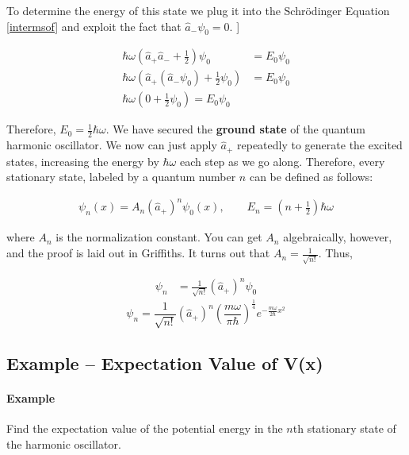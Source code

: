 To determine the energy of this state we plug it into the Schr\"odinger
Equation \ref{intermsof} and exploit the fact that $\hat{a}_-\psi_0 = 0$. ]


\begin{align} \label{}
  \hbar\omega\left(\hat{a}_+\hat{a}_- + \frac{1}{2}\right)\psi_0 &= E_0\psi_0\\
  \hbar\omega\left(\hat{a}_+(\hat{a}_-\psi_0) + \frac{1}{2}\psi_0\right) &=
  E_0\psi_0 \\ \hbar\omega \left( 0  + \frac{1}{2}\psi_0\right)  = E_0\psi_0
\end{align}\vspace{3px}

Therefore, $E_0 = \frac{1}{2}\hbar\omega$. We have secured the \textbf{ground
state} of the quantum harmonic oscillator. We now can just apply $\hat{a}_+$
repeatedly to generate the excited states, increasing the energy by
$\hbar\omega$ each step as we go along. Therefore, every stationary state,
labeled by a quantum number $n$ can be defined as follows:

\begin{align} \label{harmenergy}
   \psi_n(x) = A_n(\hat{a}_+)^n \psi_0(x), \qquad E_n = \left(
  n+\frac{1}{2} \right) \hbar\omega 
\end{align}\vspace{3px}

where $A_n$ is the normalization constant. You can get $A_n$ algebraically,
however, and the proof is laid out in Griffiths. It turns out that $A_n
= \frac{1}{\sqrt{n!}}$. Thus, 

\begin{align} \label{laddersolution}
  \psi_n &= \frac{1}{\sqrt{n!}}(\hat{a}_+)^n\psi_0 
\end{align}
 \[ \boxed{
  \psi_n = \frac{1}{\sqrt{n!}} (\hat{a}_+)^n \left( \frac{m\omega}{\pi\hbar}
\right)^{\frac{1}{4}} e^{-\frac{m\omega}{2\hbar}x^2} }
  \] \vspace{3px}

\subsection{Example -- Expectation Value of V(x)}

\paragraph{Example} Find the expectation value of the potential energy in the
$n $th stationary state of the harmonic oscillator. 

